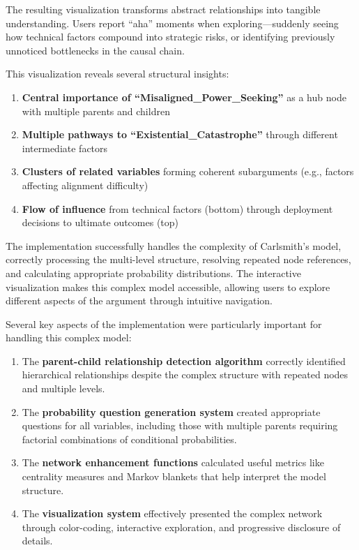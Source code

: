 \documentclass[
  11pt,
  letterpaper,
  openany]{book}
\providecommand{\tightlist}{%
  \setlength{\itemsep}{0pt}\setlength{\parskip}{0pt}}
\begin{document}
\begin{landscape}
The resulting visualization transforms abstract relationships into
tangible understanding. Users report ``aha'' moments when
exploring---suddenly seeing how technical factors compound into
strategic risks, or identifying previously unnoticed bottlenecks in the
causal chain.

This visualization reveals several structural insights:

\begin{enumerate}
\def\labelenumi{\arabic{enumi}.}
\tightlist
\item
  \textbf{Central importance of ``Misaligned\_Power\_Seeking''} as a hub
  node with multiple parents and children
\item
  \textbf{Multiple pathways to ``Existential\_Catastrophe''} through
  different intermediate factors
\item
  \textbf{Clusters of related variables} forming coherent subarguments
  (e.g., factors affecting alignment difficulty)
\item
  \textbf{Flow of influence} from technical factors (bottom) through
  deployment decisions to ultimate outcomes (top)
\end{enumerate}

The implementation successfully handles the complexity of Carlsmith's
model, correctly processing the multi-level structure, resolving
repeated node references, and calculating appropriate probability
distributions. The interactive visualization makes this complex model
accessible, allowing users to explore different aspects of the argument
through intuitive navigation.

Several key aspects of the implementation were particularly important
for handling this complex model:

\begin{enumerate}
\def\labelenumi{\arabic{enumi}.}
\item
  The \textbf{parent-child relationship detection algorithm} correctly
  identified hierarchical relationships despite the complex structure
  with repeated nodes and multiple levels.
\item
  The \textbf{probability question generation system} created
  appropriate questions for all variables, including those with multiple
  parents requiring factorial combinations of conditional probabilities.
\item
  The \textbf{network enhancement functions} calculated useful metrics
  like centrality measures and Markov blankets that help interpret the
  model structure.
\item
  The \textbf{visualization system} effectively presented the complex
  network through color-coding, interactive exploration, and progressive
  disclosure of details.
\end{enumerate}


\end{landscape}
\end{document}
